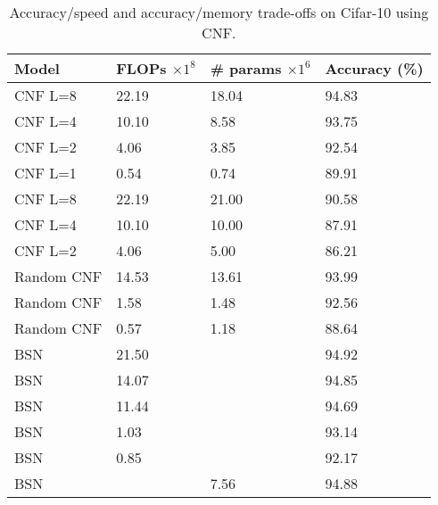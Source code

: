 \begin{table}[]
\centering
\caption{Accuracy/speed and accuracy/memory trade-offs on Cifar-10 using CNF.}
\label{cif10_cnf_flop_mem}
\begin{tabular}{|llll|}
\hline
Model                       & FLOPs $\times 1^8$ & \# params $\times 1^6$ & Accuracy (\%) \\ \hline \hline
CNF L=8                     & 22.19                 & 18.04                & 94.83         \\
CNF L=4                     & 10.10                 & 8.58                 & 93.75         \\
CNF L=2                     & 4.06                  & 3.85                 & 92.54         \\
CNF L=1                     & 0.54                  & 0.74                 & 89.91         \\ \hline
CNF L=8 \cite{DBLP:journals/corr/SaxenaV16} & 22.19                 & 21.00                & 90.58         \\
CNF L=4 \cite{DBLP:journals/corr/SaxenaV16} & 10.10                 & 10.00                & 87.91         \\
CNF L=2 \cite{DBLP:journals/corr/SaxenaV16} & 4.06                  & 5.00                 & 86.21         \\ \hline
Random CNF                  & 14.53                 & 13.61                & 93.99         \\
Random CNF                  & 1.58                  & 1.48                 & 92.56         \\
Random CNF                  & 0.57                  & 1.18                 & 88.64         \\ \hline
BSN                         & 21.50                 &                      & 94.92         \\
BSN                         & 14.07                 &                      & 94.85         \\
BSN                         & 11.44                 &                      & 94.69         \\
BSN                         & 1.03                  &                      & 93.14         \\
BSN                         & 0.85                  &                      & 92.17         \\ \hline
BSN                         &                       & 7.56                 & 94.88         \\

\end{tabular}
\end{table}
